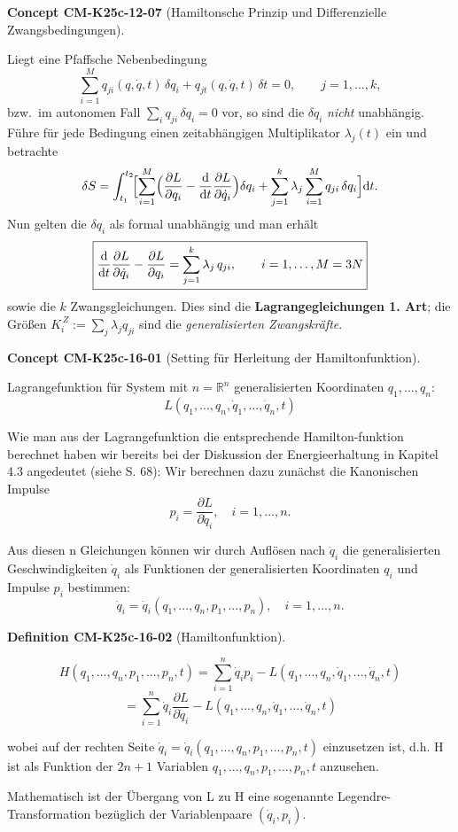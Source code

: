 \documentclass[10pt, letterpaper]{article}
\newcommand{\CustomHeading}[3]{%
  \par\medskip\noindent%
  \textbf{#1 #2} \textnormal{(#3)}.\enskip%
}
\newenvironment{DEF}[2]{\CustomHeading{Definition}{#1}{#2}}{}
\newenvironment{CONC}[2]{\CustomHeading{Concept}{#1}{#2}}{}
\begin{document}
\begin{CONC}{CM-K25c-12-07}{Hamiltonsche Prinzip und Differenzielle Zwangsbedingungen}
Liegt eine Pfaffsche Nebenbedingung
\[
  \sum_{i=1}^{M} q_{ji}(q,\dot q,t)\,\delta q_i
  + q_{jt}(q,\dot q,t)\,\delta t =0,
  \qquad j=1,\dots,k,
\]
bzw.\ im autonomen Fall  
$\sum_{i}q_{ji}\,\delta q_i =0$ vor, so sind die $\delta q_i$
\emph{nicht} unabhängig.  
Führe für jede Bedingung einen zeitabhängigen
Multiplikator $\lambda_j(t)$ ein und betrachte
\[
  \delta S
  =\int_{t_1}^{t_2}\!
     \Bigl[
        \sum_{i=1}^{M}
          \Bigl(
            \frac{\partial L}{\partial q_i}
           -\frac{\mathrm d}{\mathrm dt}
             \frac{\partial L}{\partial\dot q_i}
          \Bigr)\delta q_i
        +\sum_{j=1}^{k}\lambda_j
          \sum_{i=1}^{M}q_{ji}\,\delta q_i
     \Bigr]\mathrm dt .
\]
Nun gelten die $\delta q_i$ als formal unabhängig und man erhält
\[
  \boxed{%
    \frac{\mathrm d}{\mathrm dt}
      \frac{\partial L}{\partial\dot q_i}
    -\frac{\partial L}{\partial q_i}
    =\sum_{j=1}^{k}\lambda_j\,q_{ji},
    \qquad i=1,\dots,M=3N } 
\]
sowie die $k$ Zwangsgleichungen.  
Dies sind die \textbf{Lagrangegleichungen 1. Art};  
die Größen
$\displaystyle
  K_i^{\,Z}:=\sum_{j}\lambda_j q_{ji}
$
sind die \emph{generalisierten Zwangskräfte}.
\end{CONC}

\begin{CONC}{CM-K25c-16-01}{Setting für Herleitung der Hamiltonfunktion}
Lagrangefunktion für System mit $n=\mathbb{R}^n$ generalisierten Koordinaten $q_1,...,q_n$:
\[
L(q_1,...,q_n,\dot{q}_1,...,\dot{q}_n,t)
\]

Wie man aus der Lagrangefunktion die entsprechende Hamilton-funktion berechnet haben wir bereits bei der Diskussion der Energieerhaltung in Kapitel 4.3 angedeutet (siehe S. 68):
Wir berechnen dazu zunächst die Kanonischen Impulse
\[
p_i = \frac{\partial L}{\partial \dot{q}_i}, \quad i=1,...,n.
\]

Aus diesen n Gleichungen können wir durch Auflösen nach $\dot{q}_i$ die generalisierten Geschwindigkeiten $\dot{q}_i$ als Funktionen der generalisierten Koordinaten $q_i$ und Impulse $p_i$ bestimmen:
\[
\dot{q}_i = \dot{q}_i(q_1,...,q_n,p_1,...,p_n), \quad i=1,...,n.
\]
\end{CONC}

\begin{DEF}{CM-K25c-16-02}{Hamiltonfunktion}
\[
H(q_1,...,q_n,p_1,...,p_n,t) = \sum_{i=1}^n \dot{q}_i p_i - L(q_1,...,q_n,\dot{q}_1,...,\dot{q}_n,t)
\]
\[
= \sum_{i=1}^n \dot{q}_i \frac{\partial L}{\partial \dot{q}_i} - L(q_1,...,q_n,\dot{q}_1,...,\dot{q}_n,t)
\]

wobei auf der rechten Seite $\dot{q}_i = \dot{q}_i(q_1,...,q_n,p_1,...,p_n,t)$ einzusetzen ist, d.h. H ist als Funktion der $2n+1$ Variablen $q_1,...,q_n,p_1,...,p_n,t$ anzusehen.

Mathematisch ist der Übergang von L zu H eine sogenannte Legendre-Transformation bezüglich der Variablenpaare $(\dot{q}_i,p_i)$.
\end{DEF}
\end{document}
